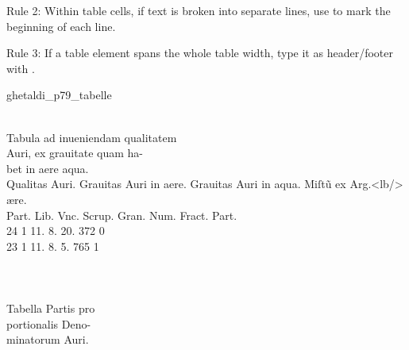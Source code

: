 \vspace{3mm}
\begin{mainrule}
Rule 2: Within table cells, if text is broken into separate lines, use  to mark the beginning of each line.
\end{mainrule}

\vspace{3mm}
\begin{mainruleLessImportant}
Rule 3: If a table element spans the whole table width, type it as header/footer with .
\end{mainruleLessImportant}

\begin{sampleImage}{ghetaldi_p79_tabelle}

\begin{typeLatin}
 \\
Tabula ad inueniendam qualitatem  \\
Auri, ex grauitate quam ha-  \\
bet in aere  aqua.  \\
Qualitas  Auri.  Grauitas Auri \lwr in aere. Grauitas Auri in aqua.  \lwr Miſt\~u ex Arg.<lb/>  ære. \\
Part.  Lib.  Vnc.  Scrup. \lwr{} Gran.  Num. Fract.  Part. \\
24  1  11.  8. \lwr{} 20.  372  0 \\
23  1  11.  8. \lwr{} 5.  765  1 \\
\someText \\
 \\
 \\
Tabella Partis pro  \\
portionalis Deno-  \\
minatorum Auri. \\

\end{typeLatin}
\end{sampleImage}
